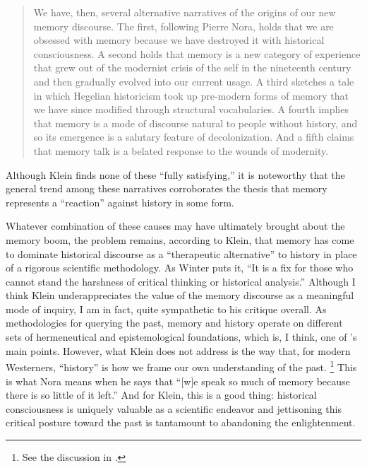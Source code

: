 \begin{quote}
    We have, then, several alternative narratives of the origins of our new memory discourse. The first, following Pierre Nora, holds that we are obsessed with memory because we have destroyed it with historical consciousness. A second holds that memory is a new category of experience that grew out of the modernist crisis of the self in the nineteenth century and then gradually evolved into our current usage. A third sketches a tale in which Hegelian historicism took up pre-modern forms of memory that we have since modified through structural vocabularies. A fourth implies that memory is a mode of discourse natural to people without history, and so its emergence is a salutary feature of decolonization. And a fifth claims that memory talk is a belated response to the wounds of modernity.%
        \autocite[134]{klein_klein2011}
\end{quote}  
\noindent
Although Klein finds none of these ``fully satisfying,'' it is noteworthy that the general trend among these narratives corroborates the thesis that memory represents a ``reaction'' against history in some form.  

Whatever combination of these causes may have ultimately brought about the memory boom, the problem remains, according to Klein, that memory has come to dominate historical discourse as a ``therapeutic alternative'' to history in place of a rigorous scientific methodology.%
    \autocite[137]{klein2011}
As Winter puts it, ``It is a fix for those who cannot stand the harshness of critical thinking or historical analysis.''%
    \autocite[283 (summarizing Klein)]{winter2006}
Although I think Klein underappreciates the value of the memory discourse as a meaningful mode of inquiry, I am in fact, quite sympathetic to his critique overall. As methodologies for querying the past, memory and history operate on different sets of hermeneutical and epistemological foundations, which is, I think, one of \yerushalmi's main points. 
%
%
However, what Klein does not address is the way that, for modern Westerners, ``history'' is how we frame our own understanding of the past.%
    \footnote{%
        See the discussion in
        \cite{schwarz_radstone-schwarz2011}.}    
This is what Nora means when he says that ``[w]e speak so much of memory because there is so little of it left.''%
    \autocite[7]{nora_representations1989}
And for Klein, this is a good thing: historical consciousness is uniquely valuable as a scientific endeavor and jettisoning this critical posture toward the past is tantamount to abandoning the enlightenment.  

